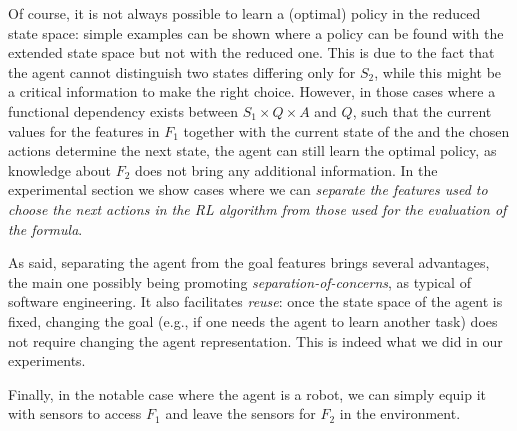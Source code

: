 Of course, it is not always possible to learn a (optimal) policy in the 
reduced state space: simple examples can be shown where
a policy can be found with the extended state space but not with 
the reduced one. This is due to the fact that the agent cannot 
distinguish two states differing only for $S_2$, while this might be 
a critical information to make the right choice. 
However, in those cases where a functional dependency exists between 
$S_1\times Q\times A$ and $Q$, such that the current values for the features in $F_1$ together with the current state of the \DFA and the chosen actions determine the next \DFA state, the agent can still learn the optimal policy,
as knowledge about $F_2$ does not bring any additional information.
In the experimental section we show cases where we can  
\emph{separate the features used to choose the next actions in the RL 
	algorithm from those used for the evaluation of the \LTLf formula}.

As said, separating the agent from the goal features 
brings several advantages, the main one possibly being promoting
\emph{separation-of-concerns}, as typical of software engineering.
It also facilitates \emph{reuse}: once the state space of the 
agent is fixed, changing the goal (e.g., if  one needs the 
agent to learn another task) does not require changing the 
agent representation. 
This is indeed what we did in our experiments.

Finally, in the notable case where the agent is a robot, we can simply 
equip it with sensors to access $F_1$ 
and leave the sensors for $F_2$ in the environment. 


